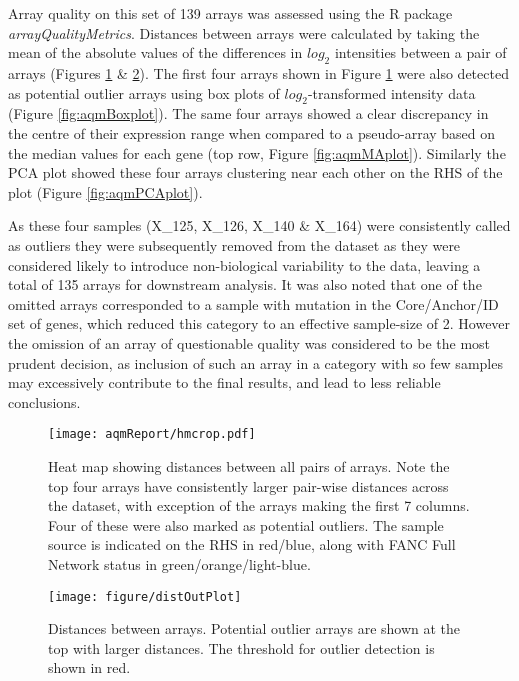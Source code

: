 \documentclass{article}\usepackage{knitr}
\begin{document}
Array quality on this set of 139 arrays was assessed using the R package \textit{arrayQualityMetrics}. 
Distances between arrays were calculated by taking the mean of the absolute values of the differences in $log_2$ intensities between a pair of arrays (Figures \ref{fig:distPlot} \& \ref{fig:distOutPlot}).
The first four arrays shown in Figure \ref{fig:distPlot} were also detected as potential outlier arrays using box plots of $log_2$-transformed intensity data (Figure \ref{fig:aqmBoxplot}).
The same four arrays showed a clear discrepancy in the centre of their expression range when compared to a pseudo-array based on the median values for each gene (top row, Figure \ref{fig:aqmMAplot}).
Similarly the PCA plot showed these four arrays clustering near each other on the RHS of the plot (Figure \ref{fig:aqmPCAplot}).

\par
\par
As these four samples (X_125, X_126, X_140 \& X_164) were consistently called as outliers they were subsequently removed from the dataset as they were considered likely to introduce non-biological variability to the data, leaving a total of 135 arrays for downstream analysis.
It was also noted that one of the omitted arrays corresponded to a sample with mutation in the Core/Anchor/ID set of genes, which reduced this category to an effective sample-size of 2.
However the omission of an array of questionable quality was considered to be the most prudent decision, as inclusion of such an array in a category with so few samples may excessively contribute to the final results, and lead to less reliable conclusions.

\begin{figure}[H]
  \centering
  \texttt{[image: aqmReport/hmcrop.pdf]}
  \caption{Heat map showing distances between all pairs of arrays. Note the top four arrays have consistently larger pair-wise distances across the dataset, with exception of the arrays making the first 7 columns. Four of these were also marked as potential outliers. The sample source is indicated on the RHS in red/blue, along with FANC Full Network status in green/orange/light-blue. \label{fig:distPlot}}
\end{figure}

\begin{knitrout}
\color{fgcolor}\begin{figure}[]


{\centering \texttt{[image: figure/distOutPlot]} 

}

\caption[Distances between arrays]{Distances between arrays. Potential outlier arrays are shown at the top with larger distances. The threshold for outlier detection is shown in red.\label{fig:distOutPlot}}
\end{figure}


\end{knitrout}
\end{document}
